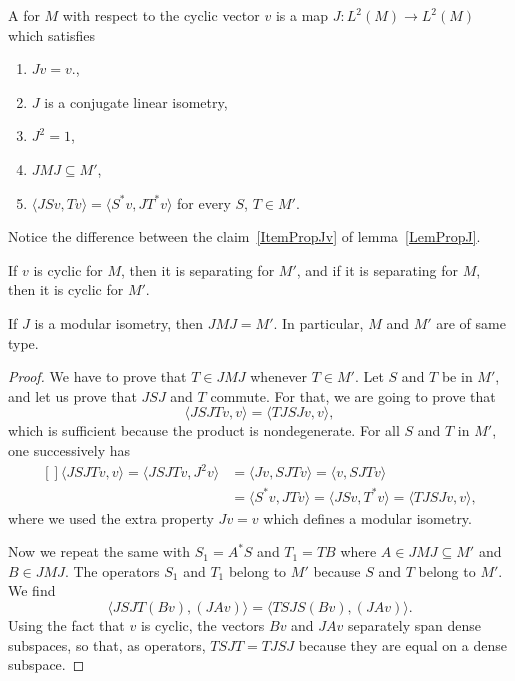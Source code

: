 \begin{definition}
	A  for $M$ with respect to the cyclic vector $v$ is a map $J\colon L^2(M)\to L^2(M)$ which satisfies
	\begin{enumerate}
		\item $Jv=v$.,
		\item $J$ is a conjugate linear isometry,
		\item $J^2=1$,
		\item $JMJ\subseteq M'$,
		\item $\langle JSv, Tv\rangle =\langle S^*v, JT^*v\rangle $ for every $S$, $T\in M'$.
	\end{enumerate}
	Notice the difference between the claim~\ref{ItemPropJv} of lemma~\ref{LemPropJ}.
\end{definition}

\begin{lemma}
	If $v$ is cyclic for $M$, then it is separating for $M'$, and if it is separating for $M$, then it is cyclic for $M'$.
\end{lemma}


\begin{proposition}
	If $J$ is a modular isometry, then $JMJ=M'$. In particular, $M$ and $M'$ are of same type.
\end{proposition}

\begin{proof}
	We have to prove that $T\in JMJ$ whenever $T\in M'$. Let $S$ and $T$ be in $M'$, and let us prove that $JSJ$ and $T$ commute. For that, we are going to prove that
	\begin{equation}
		\langle JSJTv, v\rangle =\langle TJSJv, v\rangle,
	\end{equation}
	which is sufficient because the product is nondegenerate. For all $S$ and $T$ in $M'$, one successively has
	\begin{equation}
		\begin{aligned}[]
			\langle JSJTv, v\rangle =\langle JSJTv, J^2v\rangle & =\langle Jv, SJTv\rangle =\langle v, SJTv\rangle                             \\
			                                                    & =\langle S^*v, JTv\rangle =\langle JSv, T^*v\rangle=\langle TJSJv, v\rangle,
		\end{aligned}
	\end{equation}
	where we used the extra property $Jv=v$ which defines a modular isometry.

	Now we repeat the same with $S_1=A^*S$ and $T_1=TB$ where $A\in JMJ\subseteq M'$ and $B\in JMJ$. The operators $S_1$ and $T_1$ belong to $M'$ because $S$ and $T$ belong to $M'$. We find
	\begin{equation}
		\langle JSJT(Bv), (JAv)\rangle =\langle TSJS(Bv), (JAv)\rangle.
	\end{equation}
	Using the fact that $v$ is cyclic, the vectors $Bv$ and $JAv$ separately span dense subspaces, so that, as operators, $TSJT=TJSJ$ because they are equal on a dense subspace.
\end{proof}


